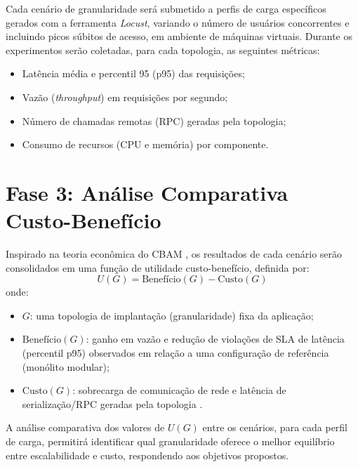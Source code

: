 Cada cenário de granularidade será submetido a perfis de carga específicos gerados com a ferramenta \textit{Locust}, variando o número de usuários concorrentes e incluindo picos súbitos de acesso, em ambiente de máquinas virtuais. Durante os experimentos serão coletadas, para cada topologia, as seguintes métricas:
\begin{itemize}
    \item Latência média e percentil 95 (p95) das requisições;
    \item Vazão (\textit{throughput}) em requisições por segundo;
    \item Número de chamadas remotas (RPC) geradas pela topologia;
    \item Consumo de recursos (CPU e memória) por componente.
\end{itemize}

\section{Fase 3: Análise Comparativa Custo-Benefício}
\label{sec:fase3}

Inspirado na teoria econômica do CBAM \cite{asundi2001cbam}, os resultados de cada cenário serão consolidados em uma função de utilidade custo-benefício, definida por:
\begin{equation}
    U(G) = \text{Benefício}(G) - \text{Custo}(G)
\end{equation}
onde:
\begin{itemize}
    \item $G$: uma topologia de implantação (granularidade) fixa da aplicação;
    \item $\text{Benefício}(G)$: ganho em vazão e redução de violações de SLA de latência (percentil p95) observados em relação a uma configuração de referência (monólito modular);
    \item $\text{Custo}(G)$: sobrecarga de comunicação de rede e latência de serialização/RPC geradas pela topologia \cite{mendonca2024serviceweaver}.
\end{itemize}

A análise comparativa dos valores de $U(G)$ entre os cenários, para cada perfil de carga, permitirá identificar qual granularidade oferece o melhor equilíbrio entre escalabilidade e custo, respondendo aos objetivos propostos.
